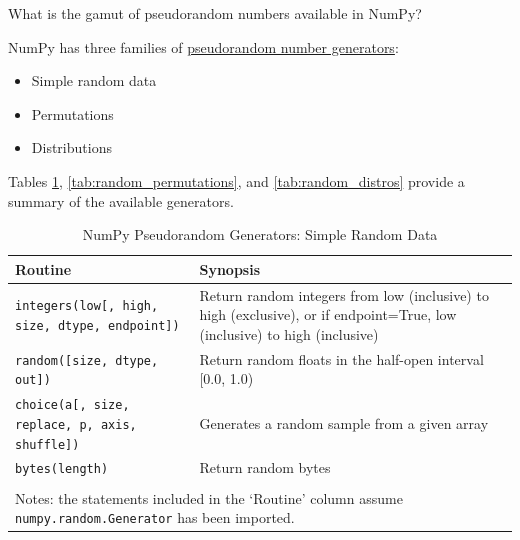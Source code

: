\documentclass[a4paper,11pt]{book}
\newcommand{\question}[1]{%
    \begin{tcolorbox}[colback=comp_c!10,colframe=comp_c,sidebyside align=top,width=\linewidth,before skip=1ex]
        #1
    \end{tcolorbox}
    \switchcolumn%
}
\newcommand{\note}[1]{%
    \begin{tcolorbox}[colback=white!0,colframe=white!10,width=\linewidth,before skip=1ex]
        #1
    \end{tcolorbox}
}
\begin{document}
\begin{paracol}{2}
	\question{\raggedright What is the gamut of pseudorandom numbers available in NumPy?}
	\note{NumPy has three families of \href{https://numpy.org/doc/stable/reference/random/generator.html}{pseudorandom number generators}:
	\begin{itemize}
		\item Simple random data 
		\item Permutations
		\item Distributions
	\end{itemize}
	
	\quad Tables \ref{tab:random_simple_data}, \ref{tab:random_permutations}, and \ref{tab:random_distros} provide a summary of the available generators.
	}
\end{paracol}

\begin{table}
	\centering
	\caption{NumPy Pseudorandom Generators: Simple Random Data} 
	\label{tab:random_simple_data}
	\begin{tabular}{lp{12cm}}
		\toprule \toprule
			Routine & Synopsis \\
			\midrule
			\texttt{integers(low[, high, size, dtype, endpoint])} & 
                        Return random integers from low (inclusive) to high (exclusive), or if endpoint=True, low (inclusive) to high (inclusive)\\
                        \texttt{random([size, dtype, out])} &
                        Return random floats in the half-open interval [0.0, 1.0)\\
                        \texttt{choice(a[, size, replace, p, axis, shuffle])} &
                        Generates a random sample from a given array\\
                        \texttt{bytes(length)} &
                        Return random bytes\\
	     	\bottomrule \\[-1.8ex]
	        \multicolumn{2}{l}{Notes: the statements included in the `Routine' column assume \texttt{numpy.random.Generator} has been imported.} \\
	\end{tabular}
\end{table}
\end{document}
